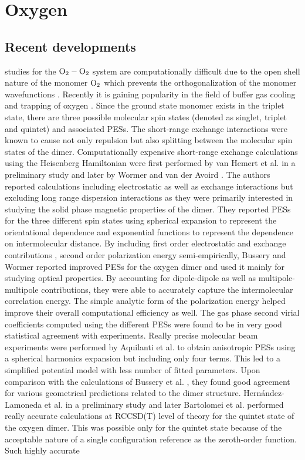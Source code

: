 \chapter{Oxygen}
\label{chap:o2}
\section{Recent developments}
    \Abinitio{} studies for the ${\rm O_2 - O_2}$ system are computationally difficult due to the open shell nature of the monomer $\rm{O_2}$ which prevents the orthogonalization of the monomer wavefunctions \cite{Bussery1993}. Recently it is gaining popularity in the field of buffer gas cooling and trapping of oxygen \cite{Friedrich1998,Avdeenkov2001}. Since the ground state monomer exists in the triplet state, there are three possible molecular spin states (denoted as singlet, triplet and quintet) and associated PESs. The short-range exchange interactions were known to cause not only repulsion but also splitting between the molecular spin states of the dimer. Computationally expensive short-range exchange calculations using the Heisenberg Hamiltonian were first performed by van Hemert et al. \cite{vanHemert1983} in a preliminary study and later by Wormer and van der Avoird \cite{Wormer1984}. The authors reported \abinitio{} calculations including electrostatic as well as exchange interactions but excluding long range dispersion interactions as they were primarily interested in studying the solid phase magnetic properties of the dimer. They reported PESs for the three different spin states using spherical expansion to represent the orientational dependence and exponential functions to represent the dependence on intermolecular distance.  By including first order electrostatic and exchange contributions \abinitio{}, second order polarization energy semi-empirically, Bussery and Wormer \cite{Bussery1993} reported improved PESs for the oxygen dimer and used it mainly for studying optical properties. By accounting for dipole-dipole as well as multipole-multipole contributions, they were able to accurately capture the intermolecular correlation energy. The simple analytic form of the polarization energy helped improve their overall computational efficiency as well. The gas phase second virial coefficients computed using the different PESs were found to be in very good statistical agreement with experiments. Really precise molecular beam experiments were performed by Aquilanti et al. \cite{Aquilanti1999} to obtain anisotropic PESs using a spherical harmonics expansion but including only four terms. This led to a simplified potential model with less number of fitted parameters. Upon comparison with the \abinitio{} calculations of Bussery et al. \cite{Bussery1993}, they found good agreement for various geometrical predictions related to the dimer structure. Hernández-Lamoneda et al. \cite{Lamoneda2005CPL} in a preliminary study and later Bartolomei et al. \cite{Bartolomei2008} performed really accurate \abinitio{} calculations at RCCSD(T) level of theory for the quintet state of the oxygen dimer. This was possible only for the quintet state because of the acceptable nature of a single configuration reference as the zeroth-order function. Such highly accurate 